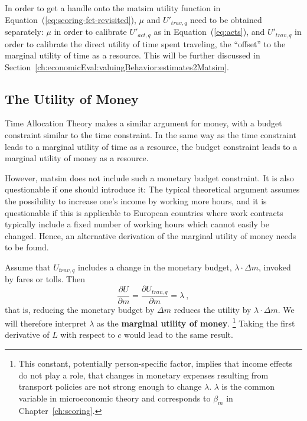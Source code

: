 In order to get a handle onto the \acrshort{matsim} utility function in Equation~(\ref{eq:scoring-fct-revisited}), $\mu$ and $U'_{trav,q}$ need to be obtained separately: $\mu$ in order to calibrate $U'_{act,q}$ as in Equation~(\ref{eq:acts}), and $U'_{trav,q}$ in order to calibrate the direct utility of time spent traveling, the ``offset'' to the marginal utility of time as a resource.
%
This will be further discussed in Section~\ref{ch:economicEval:valuingBehavior:estimates2Matsim}.

\subsection{The Utility of Money}
\label{ch:economicEval:valuingBehavior:uom}
Time Allocation Theory \citep{DeSerpa1997economicsOfTime, Jara-DiazGuevara-2003} makes a similar argument for money, with a budget constraint similar to the time constraint.
%
In the same way as the time constraint leads to a marginal utility of time as a resource, the budget constraint leads to a marginal utility of money as a resource.

However, \acrshort{matsim} does not include such a monetary budget constraint. It is also questionable if one should introduce it: The typical theoretical argument assumes the possibility to increase one's income by working more hours, and it is questionable if this is applicable to European countries where work contracts typically include a fixed number of working hours which cannot easily be changed.  
%
Hence, an alternative derivation of the marginal utility of money needs to be found.

Assume that $U_{trav,q}$ includes a change in the monetary budget, $\lambda \cdot \Delta m$, \eg invoked by fares or tolls.  Then
\[
%
\frac{\partial U}{\partial m} 
%
= \frac{\partial U_{trav,q}}{\partial m}
%
= \lambda \ ,
\]
that is, reducing the monetary budget by $\Delta m$ reduces the utility by $ \lambda \cdot \Delta m$.
%
We will therefore interpret $\lambda$ as the \textbf{marginal utility of money}.%
%
\footnote{\label{footnote:income-effects}
%
This constant, potentially person-specific factor, implies that income effects \citep{HerrigesKling1999Nonlinearincomeeffects,DalyEtAl2008WelfareMeasuresIncome, DagsvikKarlstrom2005ChoiceProbabilitiesInNonlinearRUM,Jara-Diaz1989IncomeEffectsInModeChoice} do not play a role, \ie that changes in monetary expenses resulting from transport policies are not strong enough to change $\lambda$. $\lambda$ is the common variable in microeconomic theory and corresponds to $\beta_{m}$ in Chapter~\ref{ch:scoring}.
%
}
%
Taking the first derivative of $L$ with respect to $c$ would lead to the same result.

